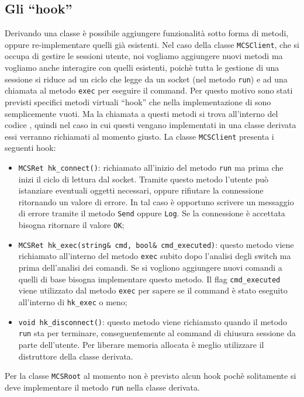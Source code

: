 \subsection{Gli ``hook''}\label{ssec:hook}
Derivando una classe \`e possibile aggiungere funzionalit\`a sotto
forma di metodi, oppure re-implementare quelli gi\`a esistenti. Nel
caso della classe \verb|MCSClient|, che si occupa di gestire le
sessioni utente, noi vogliamo aggiungere nuovi metodi ma vogliamo
anche interagire con quelli esistenti, poich\`e tutta le gestione di
una sessione si riduce ad un ciclo che legge da un socket (nel metodo
\verb|run|) e ad una chiamata al metodo \verb|exec| per eseguire il
command. Per questo motivo sono stati previsti specifici metodi
virtuali ``hook'' che nella implementazione di \mcs sono
semplicemente vuoti. Ma la chiamata a questi metodi si trova
all'interno del codice \mcs, quindi nel caso in cui questi
vengano implementati in una classe derivata essi verranno richiamati
al momento giusto. La classe \verb|MCSClient| presenta i seguenti
hook:
\begin{itemize}
\item \verb|MCSRet hk_connect()|: richiamato all'inizio del metodo
  \verb|run| ma prima che inizi il ciclo di lettura dal
  socket. Tramite questo metodo l'utente pu\`o istanziare eventuali
  oggetti necessari, oppure rifiutare la connessione ritornando un
  valore di errore. In tal caso \`e opportuno scrivere un messaggio di
  errore tramite il metodo \verb|Send| oppure \verb|Log|. Se la
  connessione \`e accettata bisogna ritornare il valore \verb|OK|;

\item \verb|MCSRet hk_exec(string& cmd, bool& cmd_executed)|: questo
  metodo viene richiamato all'interno del metodo \verb|exec| subito
  dopo l'analisi degli switch ma prima dell'analisi dei
  comandi. Se si vogliono aggiungere nuovi comandi a quelli di base
  bisogna implementare questo metodo. Il flag \verb|cmd_executed|
  viene utilizzato dal metodo \verb|exec| per sapere se il command \`e
  stato eseguito all'interno di \verb|hk_exec| o meno;

\item \verb|void hk_disconnect()|: questo metodo viene richiamato
  quando il metodo \verb|run| sta per terminare, conseguentemente al
  command di chiusura sessione da parte dell'utente. Per liberare
  memoria allocata \`e meglio utilizzare il distruttore della classe
  derivata.
\end{itemize}
%
Per la classe \verb|MCSRoot| al momento non \`e previsto alcun hook
poch\`e solitamente si deve implementare il metodo \verb|run| nella
classe derivata.

